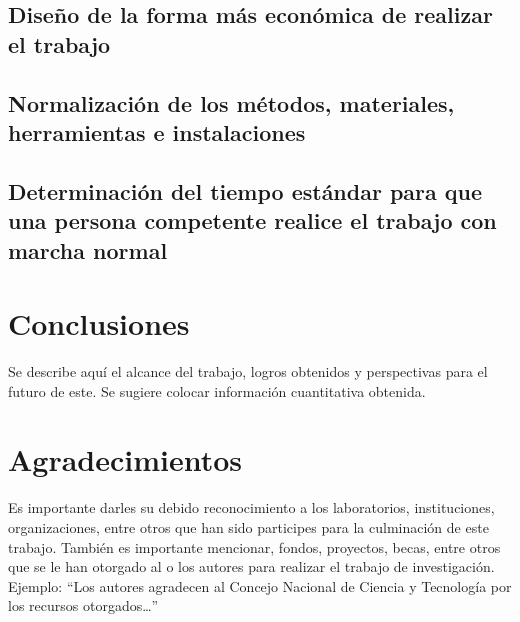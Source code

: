 \subsection{Diseño de la forma más económica de realizar el trabajo}


\subsection{Normalización de los métodos, materiales, herramientas e instalaciones}

\subsection{Determinación del tiempo estándar para que una persona competente realice el trabajo con marcha normal}


\section{Conclusiones}
    
    Se describe aquí el alcance del trabajo, logros obtenidos y perspectivas para el futuro de este. Se sugiere colocar información cuantitativa obtenida.
    
    \section{Agradecimientos}
    
    Es importante darles su debido reconocimiento a los laboratorios, instituciones, organizaciones, entre otros que han sido participes para la culminación de este trabajo. También es importante mencionar, fondos, proyectos, becas, entre otros que se le han otorgado al o los autores para realizar el trabajo de investigación. Ejemplo: “Los autores agradecen al Concejo Nacional de Ciencia y Tecnología por los recursos otorgados…”
    
    
    
